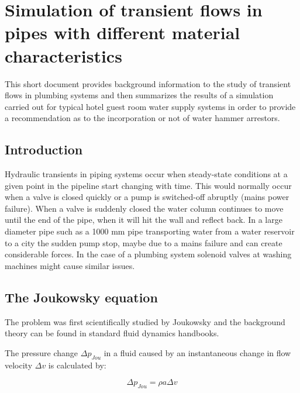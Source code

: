 
\def\authorblockformat{\raggedright}
\MakePercentComment

\chapter[Simulation of transient flows in pipes with different material characteristics]{\color{spot!50}Simulation of transient flows in pipes with different material characteristics}
\thispagestyle{plain}
\pagestyle{headings}

This short document provides background information to the study of transient flows in plumbing systems and then
summarizes the results of a simulation carried out for typical hotel guest room water supply systems in order
to provide a recommendation as to the incorporation or not of water hammer arrestors.


\section{Introduction}

Hydraulic transients in piping systems occur when steady-state conditions at a given point in the pipeline start changing with time. This would normally occur when a valve is closed quickly or a pump is switched-off abruptly (mains power failure).  When a valve is suddenly closed the water column continues to move until the end of the pipe, when it will hit the wall and reflect back. In a large diameter pipe such as a 1000 mm pipe transporting water from a water reservoir to a city the sudden pump stop, maybe due to a mains failure and can create considerable forces. In the case of a plumbing system solenoid valves at washing machines might cause similar issues. 

\section{The Joukowsky equation}

The problem was first scientifically studied by Joukowsky and the background theory can be found in standard fluid dynamics handbooks.

The pressure change \(\Delta p_{Jou}\) in a fluid caused by an instantaneous
change in flow velocity $\Delta v$ is calculated
by:

\begin{equation}
\Delta p_{Jou} = \rho a \Delta v
\label{jou}
\end{equation}

